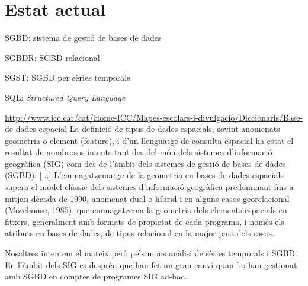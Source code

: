\chapter{Estat actual}
\label{cap:estat}


SGBD: sistema de gestió de bases de dades

SGBDR: SGBD relacional

SGST: SGBD per sèries temporals

SQL: \emph{Structured Query Language}



\url{http://www.icc.cat/cat/Home-ICC/Mapes-escolars-i-divulgacio/Diccionaris/Base-de-dades-espacial}
La definició de tipus de dades espacials, sovint anomenats geometria o element (feature), i d'un llenguatge de consulta espacial ha estat el resultat de nombrosos intents tant des del món dels sistemes d’informació geogràfica (SIG) com des de l'àmbit dels sistemes de gestió de bases de dades (SGBD). [...]
L'emmagatzematge de la geometria en bases de dades espacials supera el model clàssic dels sistemes d'informació geogràfica predominant fins a mitjan dècada de 1990, anomenat dual o híbrid i en alguns casos georelacional (Morehouse, 1985), que emmagatzema la geometria dels elements espacials en fitxers, generalment amb formats de propietat de cada programa, i només els atributs en bases de dades, de tipus relacional en la major part dels casos.


Nosaltres intentem el mateix però pels mons anàlisi de sèries temporals i SGBD.
En l'àmbit dels SIG es desprèn que han fet un gran canvi quan ho han gestionat amb SGBD en comptes de programes SIG ad-hoc.










  

